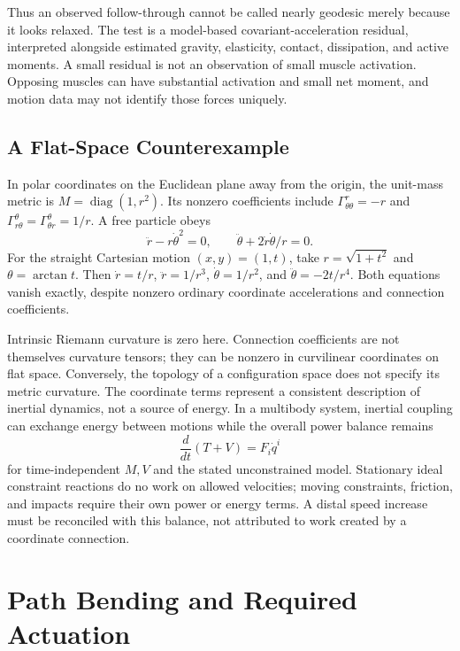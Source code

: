 Thus an observed follow-through cannot be called nearly geodesic merely
because it looks relaxed. The test is a model-based covariant-acceleration
residual, interpreted alongside estimated gravity, elasticity, contact,
dissipation, and active moments. A small residual is not an observation of
small muscle activation. Opposing muscles can have substantial activation
and small net moment, and motion data may not identify those forces uniquely.

\subsection{A Flat-Space Counterexample}

In polar coordinates on the Euclidean plane away from the origin, the unit-mass
metric is $M=\operatorname{diag}(1,r^2)$. Its nonzero coefficients include
$\Gamma^r_{\theta\theta}=-r$ and
$\Gamma^\theta_{r\theta}=\Gamma^\theta_{\theta r}=1/r$. A free particle obeys
\begin{equation}\label{eq:manifold_polar_geodesic}
 \ddot r-r\dot\theta^2=0,\qquad
 \ddot\theta+2\dot r\dot\theta/r=0.
\end{equation}
For the straight Cartesian motion $(x,y)=(1,t)$, take
$r=\sqrt{1+t^2}$ and $\theta=\arctan t$. Then
$\dot r=t/r$, $\ddot r=1/r^3$, $\dot\theta=1/r^2$, and
$\ddot\theta=-2t/r^4$. Both equations vanish exactly, despite nonzero
ordinary coordinate accelerations and connection coefficients.

Intrinsic Riemann curvature is zero here. Connection coefficients are not
themselves curvature tensors; they can be nonzero in curvilinear coordinates
on flat space. Conversely, the topology of a configuration space does not
specify its metric curvature. The coordinate terms represent a consistent
description of inertial dynamics, not a source of energy. In a multibody
system, inertial coupling can exchange energy between motions while the
overall power balance remains
\begin{equation}\label{eq:manifold_energy_balance}
 \frac{d}{dt}(T+V)=F_i\dot q^i
\end{equation}
for time-independent $M,V$ and the stated unconstrained model. Stationary
ideal constraint reactions do no work on allowed velocities; moving constraints,
friction, and impacts require their own power or energy terms. A distal speed
increase must be reconciled with this balance, not attributed to work created
by a coordinate connection.

\section{Path Bending and Required Actuation}

